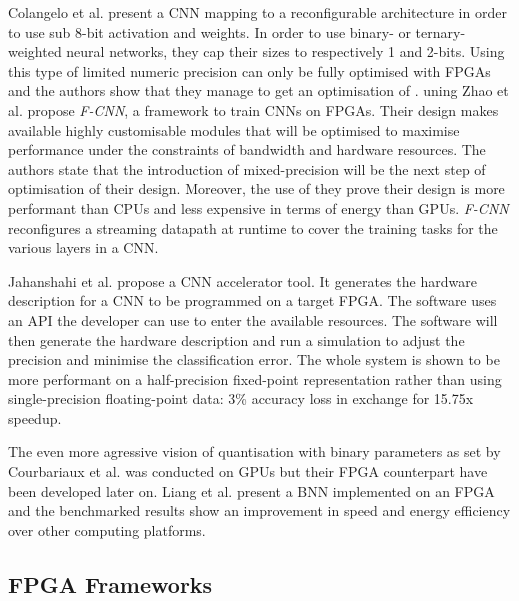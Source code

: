 Colangelo et al. \cite{Colangelo2018} present a CNN mapping to a reconfigurable architecture in order to use sub 8-bit activation and weights. In order to use binary- or ternary-weighted neural networks, they cap their sizes to respectively 1 and 2-bits. Using this type of limited numeric precision can only be fully optimised with FPGAs and the authors show that they manage to get an optimisation of .
uning
Zhao et al. \cite{Zhao2016} propose \emph{F-CNN}, a framework to train CNNs on FPGAs. Their design makes available highly customisable modules that will be optimised to maximise performance under the constraints of bandwidth and hardware resources. The authors state that the introduction of mixed-precision will be the next step of optimisation of their design. Moreover, the use of they prove their design is more performant than CPUs and less expensive in terms of energy than GPUs. \emph{F-CNN} reconfigures a streaming datapath at runtime to cover the training tasks for the various layers in a CNN.

Jahanshahi et al. \cite{Jahanshahi2019} propose a CNN accelerator tool. It generates the hardware description for a CNN to be programmed on a target FPGA. The software uses an API the developer can use to enter the available resources. The software will then generate the hardware description and run a simulation to adjust the precision and minimise the classification error. The whole system is shown to be more performant on a half-precision fixed-point representation rather than using single-precision floating-point data: 3\% accuracy loss in exchange for 15.75x speedup.

The even more agressive vision of quantisation with binary parameters as set by Courbariaux et al. \cite{Courbariaux2016} was conducted on GPUs but their FPGA counterpart have been developed later on. Liang et al. \cite{Liang2017} present a BNN implemented on an FPGA and the benchmarked results show an improvement in speed and energy efficiency over other computing platforms.



\subsection{FPGA Frameworks}\label{fpga_framework}

